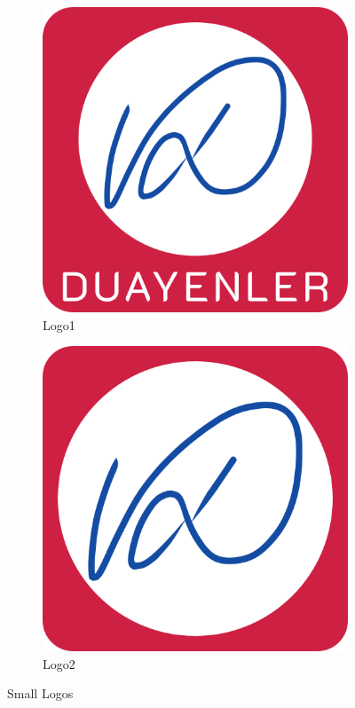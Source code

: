 \begin{figure}[H]
	\setlength{\unitlength}{\textwidth} 
	\centering
	\begin{subfigure}{.5\textwidth}
  		\centering
  		\includegraphics[width=0.48\unitlength]{images/logo1}
  		\caption{\label{fig:logo1}Logo1 }
	\end{subfigure}%
	\begin{subfigure}{.5\textwidth}
  		\centering
		\includegraphics[width=0.48\unitlength]{images/logo2}
  		\caption{\label{fig:logo2}Logo2}
	\end{subfigure}
\caption{\label{fig:calisandegree} Small Logos   }
\end{figure}

